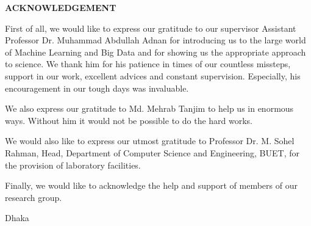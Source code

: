 \begin{center}
  \textbf{{\Large ACKNOWLEDGEMENT}}\\[60pt]
\end{center}

First of all, we would like to express our gratitude to our supervisor Assistant Professor Dr. Muhammad Abdullah Adnan for introducing us to the large world of Machine Learning and Big Data and for showing us the appropriate approach to science. We thank him for his patience in times of our countless missteps, support in our work, excellent advices and constant supervision. Especially, his encouragement in our tough days was invaluable. 

We also express our gratitude to Md. Mehrab Tanjim to help us in enormous ways. Without him it would not be possible to do the hard works.

We would also like to express our utmost gratitude to Professor Dr. M. Sohel Rahman, Head, Department of Computer Science and Engineering, BUET, for the provision of laboratory facilities. 

Finally, we would like to acknowledge the help and support of members of our research group.

\vspace*{20.0mm}

\begin{minipage}[t]{0.2\textwidth}
  Dhaka\par
  \thesisdate
\end{minipage}%
\hfill
\begin{minipage}[t]{0.45\textwidth}
  \begin{enumerate}
    \vspace{-0.75\baselineskip}
  \end{enumerate}
\end{minipage}

\endinput
